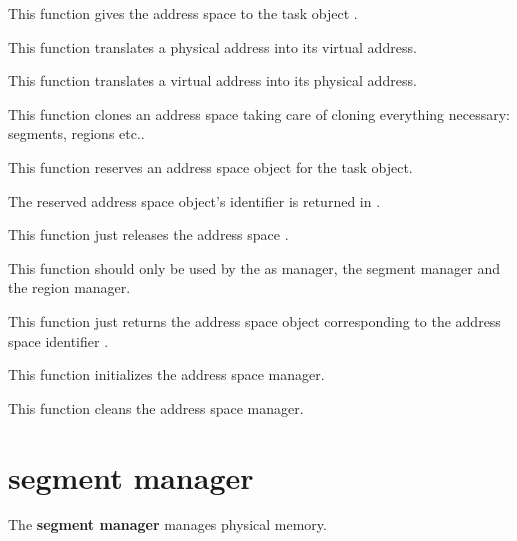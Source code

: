 	 {
	   This function gives the address space  to the
	   task object .
	 }

	 {
	   This function translates a physical address into its virtual
	   address.
	 }

	 {
	   This function translates a virtual address into its physical
	   address.
	 }

	 {
	   This function clones an address space taking care of cloning
	   everything necessary: segments, regions etc..
	 }

	 {
	   This function reserves an address space object for the
	   task  object.

	   The reserved address space object's identifier is returned
	   in .
	 }

	 {
	   This function just releases the address space .
	 }

	 {
	   This function should only be used by the as manager, the segment
	   manager and the region manager.

	   This function just returns the address space object
	   corresponding to the address space identifier .
	 }

	 {
	   This function initializes the address space manager.
	 }

	 {
	   This function cleans the address space manager.
	 }

%
%

\section{segment manager}

The \textbf{segment manager} manages physical memory.

